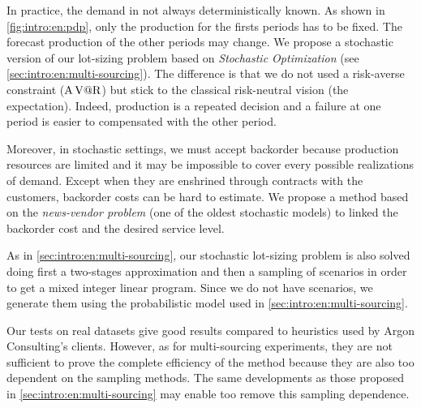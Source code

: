 In practice, the demand in not always deterministically known.
As shown in \cref{fig:intro:en:pdp}, only the production for the firsts periods has to be fixed.
The forecast production of the other periods may change.
We propose a stochastic version of our lot-sizing problem based on \emph{Stochastic Optimization} (see \cref{sec:intro:en:multi-sourcing}).
The difference is that we do not used a risk-averse constraint ($\operatorname{A\operatorname{V@R}}$) but stick to the classical risk-neutral vision (the expectation).
Indeed, production is a repeated decision and a failure at one period is easier to compensated with the other period.


Moreover, in stochastic settings, we must accept backorder because production resources are limited and it may be impossible to cover every possible realizations of demand.
Except when they are enshrined through contracts with the customers, backorder costs can be hard to estimate.
We propose a method based on the \emph{news-vendor problem} (one of the oldest stochastic models) to linked the backorder cost and the desired service level.


As in \cref{sec:intro:en:multi-sourcing}, our stochastic lot-sizing problem is also solved doing first a two-stages approximation and then a sampling of scenarios in order to get a mixed integer linear program.
Since we do not have scenarios, we generate them using the probabilistic model used in \cref{sec:intro:en:multi-sourcing}.


\medskip


Our tests on real datasets give good results compared to heuristics used by Argon Consulting's clients.
However, as for multi-sourcing experiments, they are not sufficient to prove the complete efficiency of the method because they are also too dependent on the sampling methods.
The same developments as those proposed in \cref{sec:intro:en:multi-sourcing} may enable too remove this sampling dependence.

